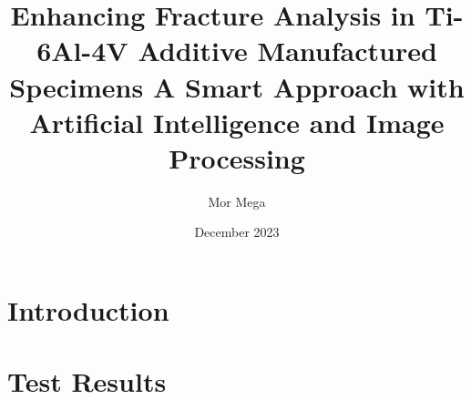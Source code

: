 \documentclass{article}
\title{Enhancing Fracture Analysis in Ti-6Al-4V Additive Manufactured Specimens A Smart Approach with Artificial Intelligence and Image Processing}
\author{Mor Mega}
\date{December 2023}
\begin{document}
\maketitle

\section{Introduction}



\section{Test Results}


%
  
 
\end{document}
